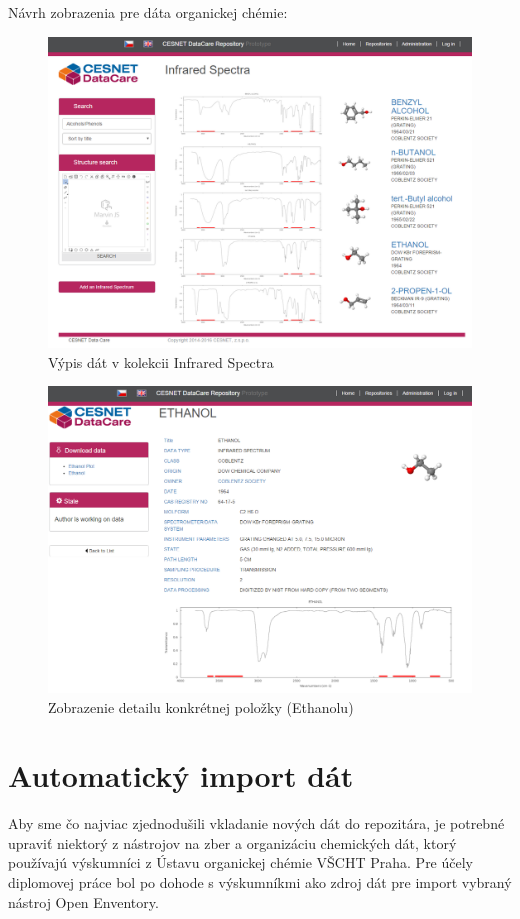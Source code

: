 \documentclass[thesis=M,slovak]{FITthesis}[2013/05/06]
\begin{document}
Návrh zobrazenia pre dáta organickej chémie:
\begin{figure}\centering
	\includegraphics[width=1.0\textwidth]{grafika/list_InfraredSpectra.png}
 	\caption[Výpis dát v kolekcii InfraredSpectra]{Výpis dát v kolekcii Infrared Spectra}\label{graphics:listInfrared}
\end{figure}

\begin{figure}\centering
	\includegraphics[width=1.0\textwidth]{grafika/detail_Ethanol.png}
 	\caption[Zobrazenie detailu konkrétnej položky (Ethanolu)]{Zobrazenie detailu konkrétnej položky (Ethanolu)}\label{graphics:Ethanol}
\end{figure}

\section{Automatický import dát}
Aby sme čo najviac zjednodušili vkladanie nových dát do repozitára, je potrebné upraviť niektorý z nástrojov na zber a organizáciu chemických dát, ktorý používajú výskumníci z Ústavu organickej chémie VŠCHT Praha. Pre účely diplomovej práce bol po dohode s výskumníkmi ako zdroj dát pre import vybraný nástroj Open Enventory.
\end{document}
